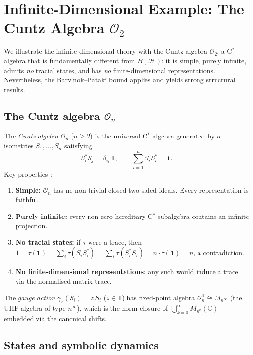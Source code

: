 \documentclass[11pt,a4paper]{article}
\theoremstyle{definition}
\newcommand{\id}{\mathbf{1}}
\begin{document}
\section{Infinite-Dimensional Example: The Cuntz Algebra $\mathcal{O}_2$}
\label{sec:cuntz}

We illustrate the infinite-dimensional theory with the Cuntz algebra
$\mathcal{O}_2$, a C$^*$-algebra that is fundamentally different from
$B(\mathcal{H})$: it is simple, purely infinite, admits \emph{no}
tracial states, and has \emph{no} finite-dimensional representations.
Nevertheless, the Barvinok--Pataki bound applies and yields strong
structural results.

\subsection{The Cuntz algebra $\mathcal{O}_n$}

The \emph{Cuntz algebra} $\mathcal{O}_n$ ($n \geq 2$) is the
universal C$^*$-algebra generated by $n$ isometries
$S_1, \ldots, S_n$ satisfying
\[
  S_i^* S_j = \delta_{ij}\, \id, \qquad
  \sum_{i=1}^n S_i S_i^* = \id.
\]
Key properties \cite{cuntz77}:
\begin{enumerate}
\item \textbf{Simple:} $\mathcal{O}_n$ has no non-trivial closed
  two-sided ideals.  Every representation is faithful.
\item \textbf{Purely infinite:} every non-zero hereditary
  C$^*$-subalgebra contains an infinite projection.
\item \textbf{No tracial states:} if $\tau$ were a trace, then
  $1 = \tau(\id) = \sum_i \tau(S_i S_i^*) = \sum_i \tau(S_i^* S_i)
  = n \cdot \tau(\id) = n$, a contradiction.
\item \textbf{No finite-dimensional representations:} any such
  would induce a trace via the normalised matrix trace.
\end{enumerate}

The \emph{gauge action} $\gamma_z(S_i) = z\, S_i$ ($z \in \mathbb{T}$)
has fixed-point algebra $\mathcal{O}_n^{\mathbb{T}} \cong
M_{n^\infty}$ (the UHF algebra of type $n^\infty$), which is the
norm closure of $\bigcup_{k=0}^\infty M_{n^k}(\mathbb{C})$ embedded
via the canonical shifts.

\subsection{States and symbolic dynamics}
\end{document}
